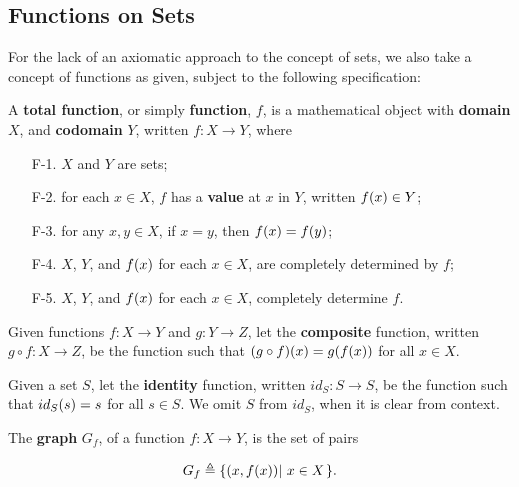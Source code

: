 \subsection{Functions on Sets}

For the lack of an axiomatic approach to the concept of sets, we also take a
concept of functions as given, subject to the following specification:

\begin{specification} A \textbf{total function}, or simply \textbf{function},
$f$, is a mathematical object with \textbf{domain} $X$, and \textbf{codomain}
$Y$, written $f:X\rightarrow Y$, where

\begin{enumerate}

\item [F-1.] $X$ and $Y$ are sets;

\item [F-2.] for each $x\in X$, $f$ has a \textbf{value} at $x$ in $Y$, written
$f\mathopen{}\left({x}\right)\mathclose{}\in Y$;

\item [F-3.] for any $x,y\in X$, if $x=y$, then $f\mathopen{}\left({x}\right)\mathclose{}=f\mathopen{}\left({y}\right)\mathclose{}$;

\item [F-4.] $X$, $Y$, and $f\mathopen{}\left({x}\right)\mathclose{}$ for each $x\in X$, are completely determined
by $f$;

\item [F-5.] $X$, $Y$, and $f\mathopen{}\left({x}\right)\mathclose{}$ for each $x\in X$, completely determine $f$.

\end{enumerate}

\end{specification}

\begin{definition} Given functions $f:X\rightarrow Y$ and $g:Y\rightarrow Z$,
let the \textbf{composite} function, written $g\circ f : X \rightarrow Z$, be
the function such that $\mathopen{}\left({g\circ f}\right)\mathclose{}\mathopen{}\left({x}\right)\mathclose{}=g\mathopen{}\left({f\mathopen{}\left({x}\right)\mathclose{}}\right)\mathclose{}$ for all $x\in X$.
\end{definition}

\begin{definition} Given a set $S$, let the \textbf{identity} function, written
$id_S: S \rightarrow S$, be the function such that $id_S\mathopen{}\left({s}\right)\mathclose{}=s$ for all $s\in
S$. We omit $S$ from $id_S$, when it is clear from context. \end{definition}

\begin{definition} The \textbf{graph} $G_f$, of a function $f:X\rightarrow Y$, is the
set of pairs

$$G_f\triangleq\mathopen{}\left\{{\mathopen{}\left({x,f\mathopen{}\left({x}\right)\mathclose{}}\right)\mathclose{}\mathopen{}\left|\ {x\in X}\right.\mathclose{}}\right\}\mathclose{}.$$

\end{definition}

